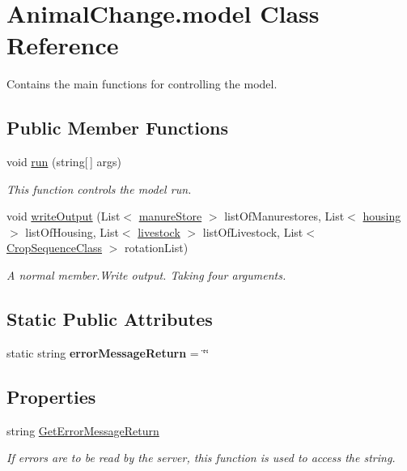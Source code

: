 \hypertarget{class_animal_change_1_1model}{}\section{Animal\+Change.\+model Class Reference}
\label{class_animal_change_1_1model}


Contains the main functions for controlling the model.  


\subsection*{Public Member Functions}
\begin{DoxyCompactItemize}
\item 
void \mbox{\hyperlink{class_animal_change_1_1model_adc89d4cffd48c182ee6496328e888727}{run}} (string\mbox{[}$\,$\mbox{]} args)
\begin{DoxyCompactList}\small\item\em This function controls the model run. \end{DoxyCompactList}\item 
void \mbox{\hyperlink{class_animal_change_1_1model_a8e454fd8dcd665b2e2531b499729dcae}{write\+Output}} (List$<$ \mbox{\hyperlink{classmanure_store}{manure\+Store}} $>$ list\+Of\+Manurestores, List$<$ \mbox{\hyperlink{classhousing}{housing}} $>$ list\+Of\+Housing, List$<$ \mbox{\hyperlink{classlivestock}{livestock}} $>$ list\+Of\+Livestock, List$<$ \mbox{\hyperlink{class_crop_sequence_class}{Crop\+Sequence\+Class}} $>$ rotation\+List)
\begin{DoxyCompactList}\small\item\em A normal member.\+Write output. Taking four arguments. \end{DoxyCompactList}\end{DoxyCompactItemize}
\subsection*{Static Public Attributes}
\begin{DoxyCompactItemize}
\item 
\mbox{\label{class_animal_change_1_1model_a00134912be0bf6244574ee6d006c5afa}} 
static string {\bfseries error\+Message\+Return} = \char`\"{}\char`\"{}
\end{DoxyCompactItemize}
\subsection*{Properties}
\begin{DoxyCompactItemize}
\item 
string \mbox{\hyperlink{class_animal_change_1_1model_a987a46cb1a575a4d2c3cd2710dd1af39}{Get\+Error\+Message\+Return}}
\begin{DoxyCompactList}\small\item\em If errors are to be read by the server, this function is used to access the string. \end{DoxyCompactList}\end{DoxyCompactItemize}


